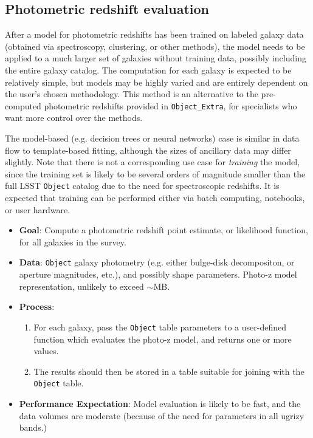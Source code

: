 \documentclass[DM,authoryear,toc]{lsstdoc}
\begin{document}
\subsection{Photometric redshift evaluation}

After a model for photometric redshifts has been trained on labeled galaxy
data (obtained via spectroscopy, clustering, or other methods), the model
needs to be applied to a much larger set of galaxies without training data,
possibly including the entire galaxy catalog. The computation for each galaxy
is expected to be relatively simple, but models may be highly varied and
are entirely dependent on the user's chosen methodology. This method is an
alternative to the pre-computed photometric redshifts provided in
\texttt{Object\_Extra}, for specialists who want more control over the
methods.

The model-based (e.g. decision trees or neural networks) case is similar in
data flow to template-based fitting, although the sizes of ancillary data may
differ slightly. Note that there is not a corresponding use case for
\textit{training} the model, since the training set is likely to be several
orders of magnitude smaller than the full LSST \texttt{Object} catalog due to
the need for spectroscopic redshifts. It is expected that training can be performed either via batch computing, notebooks, or user hardware.

\begin{itemize}
  \item \textbf{Goal}: Compute a photometric redshift point estimate, or likelihood function, for all galaxies in the survey.
  \item \textbf{Data}: \texttt{Object} galaxy photometry (e.g. either
  bulge-disk decompositon, or aperture magnitudes, etc.), and possibly shape
  parameters. Photo-z model representation, unlikely to exceed $\sim$MB.
  \item \textbf{Process}: 
  \begin{enumerate}
    \item For each galaxy, pass the \texttt{Object} table parameters to a user-defined function which evaluates the photo-z model, and returns one or more values.
    \item The results should then be stored in a table suitable for joining with the \texttt{Object} table.
  \end{enumerate}
  \item \textbf{Performance Expectation}: Model evaluation is likely to be
  fast, and the data volumes are moderate (because of the need for parameters
  in all ugrizy bands.)
\end{itemize}
\end{document}
